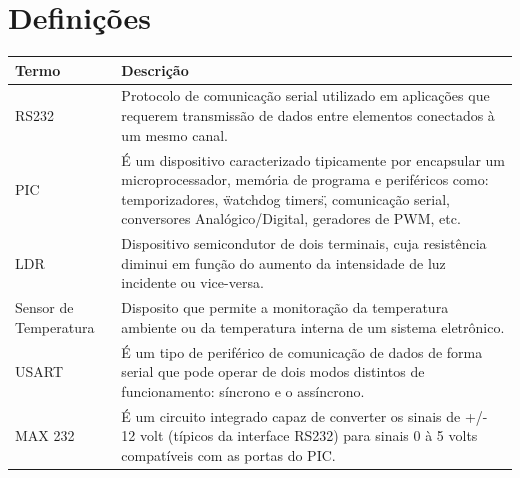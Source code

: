 \documentclass{report}
\begin{document}
  \section{Definições}
    \FloatBarrier
    \begin{table}[H]
      \begin{center}
        \begin{tabular}[pos]{|m{5cm} | m{9cm}|} 
          \hline
          \cellcolor[gray]{0.9}\textbf{Termo} & \cellcolor[gray]{0.9}\textbf{Descrição} \\ \hline
          RS232                & Protocolo de comunicação serial utilizado em aplicações que requerem transmissão de dados entre elementos conectados à um mesmo canal. \\ \hline 
          PIC & É um dispositivo caracterizado tipicamente por encapsular um microprocessador, memória de programa e periféricos como: temporizadores, \"watchdog timers\", comunicação 
          serial, conversores Analógico/Digital, geradores de PWM, etc. \\ \hline
          LDR & Dispositivo semicondutor de dois terminais, cuja resistência diminui em função do aumento da intensidade de luz incidente ou vice-versa.\\ \hline
          Sensor de Temperatura & Disposito que permite a monitoração da temperatura ambiente ou da temperatura interna de um sistema eletrônico. \\ \hline 
          USART & É um tipo de periférico de comunicação de dados de forma serial que pode operar de dois modos distintos de funcionamento: síncrono e o assíncrono. \\ \hline
          MAX 232 & É um circuito integrado capaz de converter os sinais de +/- 12 volt (típicos da interface RS232) para sinais 0 à 5 volts compatíveis com as portas do PIC. \\ \hline 
        \end{tabular}
      \end{center}
    \end{table}  

\end{document}
